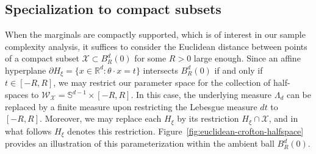 \documentclass[11pt]{amsart}
\theoremstyle{definition}
\theoremstyle{remark}
\newcommand{\R}{\mathbb{R}}
\newcommand{\1}{\mathbf{1}}
\newcommand{\Sd}{\mathbb{S}}
\numberwithin{equation}{section}
\begin{document}
\subsection{Specialization to compact subsets} When the marginals are compactly supported, which is of interest in our sample complexity analysis, it suffices to
consider the Euclidean distance between points of a compact subset
$\mathcal{X} \subset B_R^d(0)$ for some $R > 0$ large enough. Since an affine hyperplane $\partial H_\xi = \{x\in \R^d: \theta\cdot x = t\}$ intersects $B^d_R(0)$ if and only if $t \in [-R, R]$, we may restrict our parameter space for the collection of half-spaces to $\mathcal{W}_\mathcal{X} = \Sd^{d-1} \times [-R,R]$. In this case, the underlying measure $\Lambda_{d}$ can be replaced by a finite measure upon restricting the Lebesgue measure $dt$ to $[-R,R]$. Moreover, we may replace each $H_\xi$ by its
restriction $H_\xi \cap \mathcal{X}$, and in what follows $H_\xi$ denotes this restriction. Figure~\ref{fig:euclidean-crofton-halfspace} provides an illustration of this parameterization within the ambient ball \(B_R^d(0)\).
\end{document}
